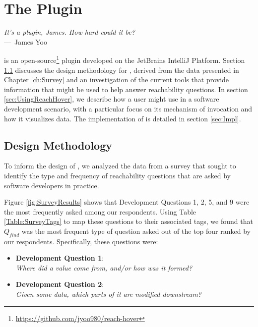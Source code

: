 
\chapter{The \toolname{} Plugin}
\label{ch:Tool}

\begin{epigraph}
  \emph{It's a plugin, James. How hard could it be?}\\
     ---~James Yoo
\end{epigraph}

\noindent \toolname{} is an open-source\footnote{\url{https://github.com/jyoo980/reach-hover}}
plugin developed on the JetBrains IntelliJ Platform.
Section \ref{sec:DesignMeth} discusses the design methodology for \toolname{},
derived from the data presented in Chapter \ref{ch:Survey} and an investigation
of the current tools that provide information that might be used to help answer
reachability questions.
In section \ref{sec:UsingReachHover}, we describe how a user might use
\toolname{} in a software development scenario, with a particular focus on
its mechanism of invocation and how it visualizes data.
The implementation of \toolname{} is detailed in section
\ref{sec:Impl}.

\section{Design Methodology}
\label{sec:DesignMeth}

\noindent To inform the design of \toolname{}, we analyzed the data from a 
survey that sought to identify the type and frequency of reachability questions 
that are asked by software developers in practice.

Figure \ref{fig:SurveyResults} shows that Development Questions 1, 2, 5, and 9
were the most frequently asked among our respondents.
Using Table \ref{Table:SurveyTags} to map these questions to their associated
tags, we found that $Q_{find}$ was the most frequent type of question asked out
of the top four ranked by our respondents.
Specifically, these questions were:

\begin{itemize}
  \item[] \textbf{Development Question 1}:\\ \textit{Where did a value come from,
  and/or how was it formed?}
  \item[] \textbf{Development Question 2}:\\ \textit{Given some data, which
  parts of it are modified downstream?}
\end{itemize}

